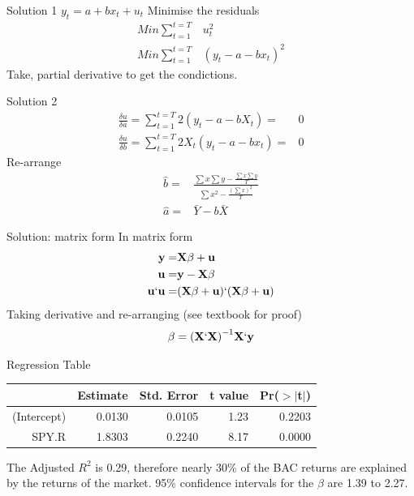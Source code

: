 \documentclass[14pt,xcolor=pdftex,dvipsnames,table]{beamer}\usepackage[]{graphicx}\usepackage[]{color}
\begin{document}
\begin{frame}{Solution 1}
$ y_t = a + bx_t + u_t$
\vskip 1cm
Minimise the residuals
\begin{align*}
Min\sum_{t=1}^{t=T}& u_t^2 \\
Min\sum_{t=1}^{t=T}& (y_t - a - bx_t)^2 
\end{align*}
Take, partial derivative to get the condictions.
\end{frame}

\begin{frame}{Solution 2}
\begin{align*}
\frac{\delta u}{\delta a} = \sum_{t=1}^{t=T} 2(y_t - a - bX_t) =& 0\\
\frac{\delta u}{\delta b} = \sum_{t=1}^{t=T} 2X_t(y_t - a - bx_t) =& 0
\end{align*}
Re-arrange
\begin{align*}
\hat{b} =& \frac{\sum x \sum y - \frac{\sum x \sum y}{T}}{\sum x^2 - \frac{(\sum x)^2}{T}}\\
\hat{a} = & \bar{Y} - b\bar{X}
\end{align*}
\end{frame}

\begin{frame}{Solution: matrix form}
In matrix form
\begin{align*}
\mathbf{y} =& \mathbf{X \beta} + \mathbf{u}\\
\mathbf{u} =& \mathbf{y} - \mathbf{X\beta}\\
\mathbf{u}` \mathbf{u} =& (\mathbf{X \beta} + \mathbf{u})`(\mathbf{X \beta} + \mathbf{u})\\ 
\end{align*}
Taking derivative and re-arranging (see textbook for proof)
\begin{align*}
\mathbf{\beta} = \mathbf{(X`X)}^{-1}\mathbf{X`y}
\end{align*}
\end{frame}

\begin{frame}{Regression Table}
\begin{table}[ht]
\centering
\begin{tabular}{rrrrr}
  \hline
 & Estimate & Std. Error & t value & Pr($>$$|$t$|$) \\ 
  \hline
(Intercept) & 0.0130 & 0.0105 & 1.23 & 0.2203 \\ 
  SPY.R & 1.8303 & 0.2240 & 8.17 & 0.0000 \\ 
   \hline
\end{tabular}
\end{table}
The Adjusted $R^2$ is 0.29, therefore nearly 30\% of the BAC returns are explained by the returns of the market.  95\% confidence intervals for the $\beta$ are 1.39 to 2.27. 
\end{frame}
\end{document}
